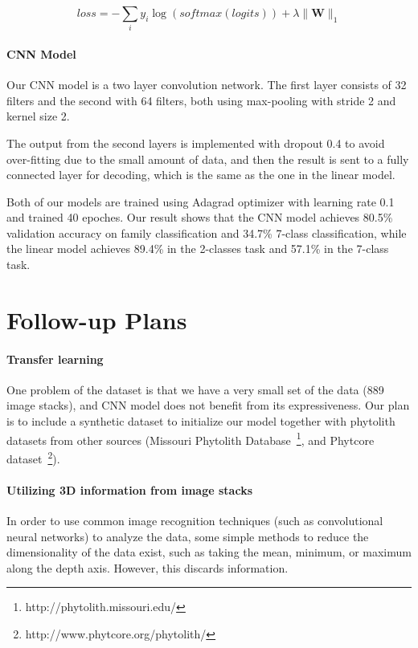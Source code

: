 \documentclass{article}
\begin{document}
$$\mathit{loss} = -\sum\limits_{i} y_i\log(\mathit{softmax}(\mathit{logits})) + \lambda \|\mathbf{W}\|_1$$

\paragraph{CNN Model}

Our CNN model is a two layer convolution network. The first layer consists of 32 filters and the second with 64 filters, both using max-pooling with stride 2 and kernel size 2.

The output from the second layers is implemented with dropout 0.4 to avoid over-fitting due to the small amount of data, and then the result is sent to a fully connected layer for decoding, which is the same as the one in the linear model.

\medskip

Both of our models are trained using Adagrad optimizer with learning rate 0.1 and trained 40 epoches.
Our result shows that the CNN model achieves 80.5\% validation accuracy on family classification and 34.7\% 7-class classification, while the linear model achieves 89.4\% in the 2-classes task and 57.1\% in the 7-class task.


\section{Follow-up Plans}

\paragraph{Transfer learning} One problem of the dataset is that we have a very small set of the data (889 image stacks), and CNN model does not benefit from its expressiveness. Our plan is to include a synthetic dataset to initialize our model together with phytolith datasets from other sources (Missouri Phytolith Database~\footnote{http://phytolith.missouri.edu/}, and Phytcore dataset~\footnote{http://www.phytcore.org/phytolith/}).

\paragraph{Utilizing 3D information from image stacks}

In order to use common image recognition techniques (such as convolutional neural networks) to analyze the data, some simple methods to reduce the dimensionality of the data exist, such as taking the mean, minimum, or maximum along the depth axis. However, this discards information. 
\end{document}

